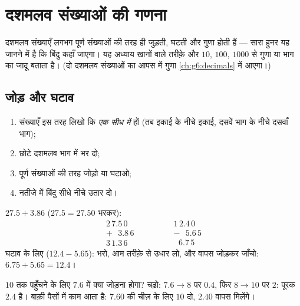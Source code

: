 \chapter{दशमलव संख्याओं की गणना}\label{ch:g5:decimalops}

दशमलव संख्याएँ लगभग पूर्ण संख्याओं की तरह ही जुड़ती, घटती और गुणा
होती हैं --- सारा हुनर यह जानने में है कि बिंदु कहाँ जाएगा। यह
अध्याय खानों वाले तरीक़े और $10$, $100$, $1000$ से गुणा या भाग
का जादू बताता है। (दो दशमलव संख्याओं का आपस में गुणा
\cref{ch:g6:decimals} में आएगा।)

\section{जोड़ और घटाव}

\begin{method}[बिंदु के साथ खाने]\label{met:g5:decimalops:addsub}
\begin{enumerate}
  \item संख्याएँ इस तरह लिखो कि \emph{ एक सीध में}
        हों (तब इकाई के नीचे इकाई, दसवें भाग के नीचे दसवाँ भाग);
  \item छोटे दशमलव भाग में  भर दो;
  \item पूर्ण संख्याओं की तरह जोड़ो या घटाओ;
  \item नतीजे में बिंदु सीधे नीचे उतार दो।
\end{enumerate}
\end{method}

\begin{example}\label{ex:g5:decimalops:addsub}
$27.5 + 3.86$ ($27.5 = 27.50$ भरकर):
\[
\begin{array}{r}
2\,7.5\,0 \\
+\ \ \ 3.8\,6 \\
\hline
3\,1.3\,6
\end{array}
\qquad\qquad
\begin{array}{r}
1\,2.4\,0 \\
-\ \ \ 5.6\,5 \\
\hline
\ \ \,6.7\,5
\end{array}
\]
घटाव के लिए ($12.4 - 5.65$): भरो, आम तरीक़े से उधार लो, और वापस
जोड़कर जाँचो: $6.75 + 5.65 = 12.4$।
\end{example}

\begin{example}[मन-ही-मन पूरक]\label{ex:g5:decimalops:complement}
$10$ तक पहुँचने के लिए $7.6$ में क्या जोड़ना होगा? चढ़ो:
$7.6 \to 8$ पर $0.4$, फिर $8 \to 10$ पर $2$: पूरक $2.4$ है।
बाक़ी पैसों में काम आता है: $7.60$ की चीज़ के लिए $10$ दो, $2.40$ वापस मिलेंगे।
\end{example}

